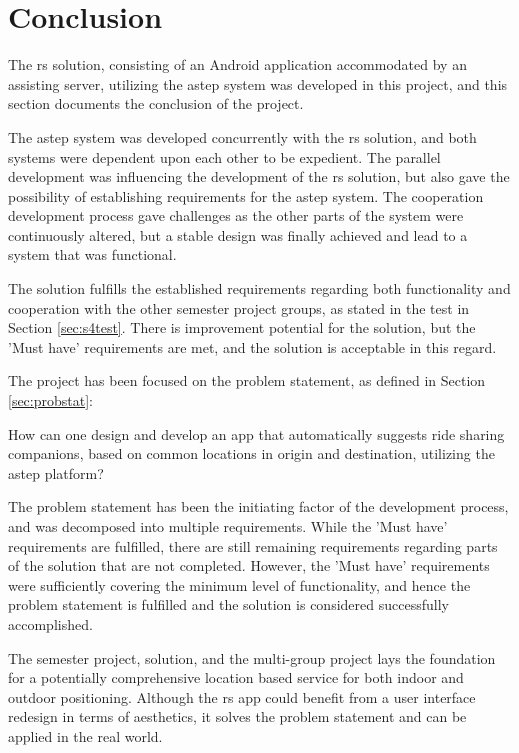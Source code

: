 \section{Conclusion}
The \gls{rs} solution, consisting of an Android application accommodated by an assisting server, utilizing the \gls{astep} system was developed in this project, and this section documents the conclusion of the project.


The \gls{astep} system was developed concurrently with the \gls{rs} solution, and both systems were dependent upon each other to be expedient.
The parallel development was influencing the development of the \gls{rs} solution, but also gave the possibility of establishing requirements for the \gls{astep} system.
The cooperation development process gave challenges as the other parts of the system were continuously altered, but a stable design was finally achieved and lead to a system that was functional.


The solution fulfills the established requirements regarding both functionality and cooperation with the other semester project groups, as stated in the test in Section \ref{sec:s4test}.
There is improvement potential for the solution, but the 'Must have' requirements are met, and the solution is acceptable in this regard.


The project has been focused on the problem statement, as defined in Section \ref{sec:probstat}:

{\addtolength{\leftskip}{10mm}\addtolength{\rightskip}{10mm}\noindent\hrulefill\it
	
	\noindent How can one design and develop an app that automatically suggests ride sharing companions, based on common locations in origin and destination, utilizing the \gls{astep} platform? 
	
	\noindent\hrulefill
	
}

The problem statement has been the initiating factor of the development process, and was decomposed into multiple requirements.
While the 'Must have' requirements are fulfilled, there are still remaining requirements regarding parts of the solution that are not completed.
However, the 'Must have' requirements were sufficiently covering the minimum level of functionality, and hence the problem statement is fulfilled and the solution is considered successfully accomplished.


The semester project, solution, and the multi-group project lays the foundation for a potentially comprehensive location based service for both indoor and outdoor positioning.
Although the \gls{rs} app could benefit from a user interface redesign in terms of aesthetics, it solves the problem statement and can be applied in the real world.
